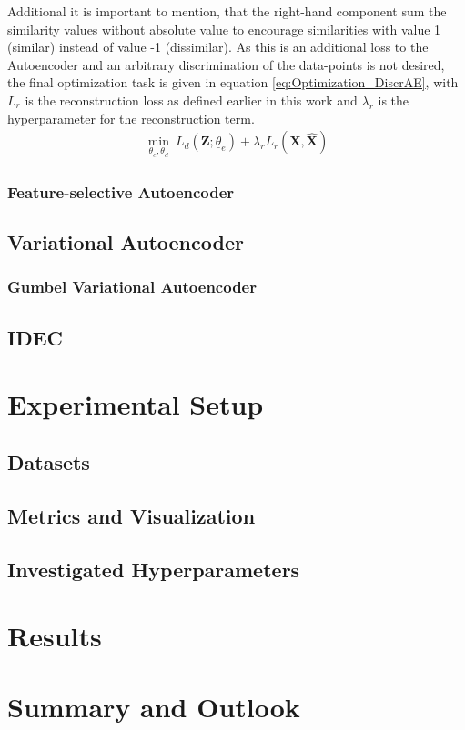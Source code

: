 \documentclass[12pt,DIV14,BCOR12mm,a4paper,footexclude,headinclude,halfparskip-,twoside,openright,openany,cleardoubleempty,idxtotoc,bibtotoc]{scrreprt} %
\numberwithin{equation}{chapter}
\begin{document}
Additional it is important to mention, that the right-hand component sum the similarity values without absolute value to encourage similarities with value 1 (similar) instead of value -1 (dissimilar). As this is an additional loss to the Autoencoder and an arbitrary discrimination of the data-points is not desired, the final optimization task is given in equation \ref{eq:Optimization_DiscrAE}, with $L_r$ is the reconstruction loss as defined earlier in this work and $\lambda_r$ is the hyperparameter for the reconstruction term.
\begin{align}
	 \underset{\underline{\theta}_e, \underline{\theta}_d}\min\ L_d(\mathbf{Z};\underline{\theta}_e)+\lambda_r L_r(\mathbf{X,\hat{\mathbf{X}}})\label{eq:Optimization_DiscrAE}
\end{align}

\subsection{Feature-selective Autoencoder}
\section{Variational Autoencoder}
\subsection{Gumbel Variational Autoencoder}
\section{IDEC}
\chapter{Experimental Setup}
\section{Datasets}
\section{Metrics and Visualization}
\section{Investigated Hyperparameters}
\chapter{Results}
\chapter{Summary and Outlook}
\end{document}
